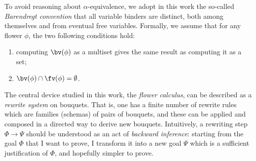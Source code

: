 To avoid reasoning about $\alpha$-equivalence, we adopt in this work the
so-called \emph{Barendregt convention} that all variable binders are distinct,
both among themselves and from eventual free variables. Formally, we assume that
for any flower $\phi$, the two following conditions hold:
\begin{enumerate}
  \item computing $\bv(\phi)$ as a multiset gives the same result as computing
  it as a set;
  \item $\bv(\phi) \cap \fv(\phi) = \emptyset$.
\end{enumerate} 

The central device studied in this work, the \emph{flower calculus}, can be
described as a \emph{rewrite system} on bouquets. That is, one has a finite
number of rewrite rules which are families (schemas) of pairs of bouquets, and
these can be applied and composed in a directed way to derive new bouquets.
Intuitively, a rewriting step $\Phi \rightarrow \Psi$ should be understood as an
act of \emph{backward inference}: starting from the goal $\Phi$ that I want to
prove, I transform it into a new goal $\Psi$ which is a sufficient justification
of $\Phi$, and hopefully simpler to prove.

